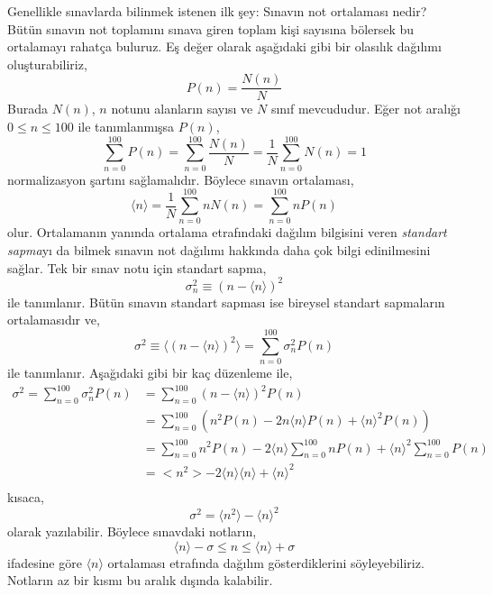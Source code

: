 \documentclass[a4paper,12pt, twoside]{article}
\begin{document}
Genellikle sınavlarda bilinmek istenen ilk şey: Sınavın not ortalaması nedir? Bütün sınavın not toplamını sınava giren toplam kişi sayısına bölersek bu ortalamayı rahatça buluruz. Eş değer olarak aşağıdaki gibi bir olasılık dağılımı oluşturabiliriz,
\begin{equation}
P\left( n\right) =\dfrac {N(n) }{N}
\label{eq:probability_distrubition_P}
\end{equation}
Burada $N(n)$, $n$ notunu alanların sayısı ve $N$ sınıf mevcududur. Eğer not aralığı $0\leq n \leq 100$ ile tanımlanmışsa $P(n)$,
\begin{equation}
\sum ^{100}_{n=0}P\left( n\right) =\sum ^{100}_{n=0}\dfrac {N(n) }{N}=\dfrac {1}{N}\sum ^{100}_{n=0}N(n) =1
\label{eq:normalization_P}
\end{equation}
normalizasyon şartını sağlamalıdır. Böylece sınavın ortalaması,
\begin{equation}
\langle n \rangle =\dfrac {1}{N}\sum ^{100}_{n=0}nN\left( n\right) =\sum ^{100}_{n=0}nP\left( n\right) 
\label{eq:average_grade}
\end{equation}
olur. Ortalamanın yanında ortalama etrafındaki dağılım bilgisini veren \emph{standart sapma}yı da bilmek sınavın not dağılımı hakkında daha çok bilgi edinilmesini sağlar. Tek bir sınav notu için standart sapma,
\begin{equation}
\sigma ^{2}_{n}\equiv(n-\langle n\rangle) ^{2}
\label{eq:standard_deviation_atom}
\end{equation}
ile tanımlanır. Bütün sınavın standart sapması ise bireysel standart sapmaların ortalamasıdır ve,
\begin{equation}
\sigma ^{2}\equiv \langle \left( n-\langle n\rangle \right) ^{2}\rangle =\sum ^{100}_{n=0}\sigma _{n}^2P\left( n\right) 
\label{eq:standard_deviation_exam}
\end{equation}
ile tanımlanır. Aşağıdaki gibi bir kaç düzenleme ile,
\begin{align*}
\sigma ^{2}=\sum ^{100}_{n=0}\sigma ^{2}_{n}P\left( n\right) &=\sum ^{100}_{n=0}\left(n -\langle n\rangle \right) ^{2}P\left( n\right) \\
&=\sum ^{100}_{n=0}\left( n^{2}P\left( n\right) -2n\langle n\rangle P\left( n\right) +\langle n\rangle ^{2}P\left( n\right) \right)\\
&=\sum ^{100}_{n=0}n^{2}P\left( n\right) -2 \langle n \rangle\sum ^{100}_{n=0}nP\left( n\right) +\langle n\rangle ^{2}\sum ^{100}_{n=0}P\left( n\right) \\
&=<n^{2}>-2 \langle n \rangle\langle n\rangle +\langle n\rangle ^{2}\\
\end{align*}
kısaca,
\begin{equation}
\sigma^2 = \langle n^{2}\rangle - \langle n \rangle^{2}
\end{equation}
olarak yazılabilir. Böylece sınavdaki notların,
\begin{equation*}
\langle n \rangle - \sigma \leq n \leq \langle n \rangle + \sigma
\end{equation*}
ifadesine göre $\langle n \rangle$ ortalaması etrafında dağılım gösterdiklerini söyleyebiliriz. Notların az bir kısmı bu aralık dışında kalabilir.
\end{document}
